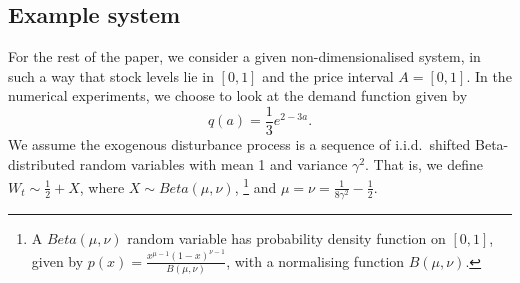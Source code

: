 \documentclass[main.tex]{subfiles}
\begin{document}
\subsection{Example system}\label{sec:bellman_example_markdown}
For the rest of the paper, we consider a given non-dimensionalised
system, in such a way that stock levels lie in $[0,1]$ and the price
interval $A=[0,1]$.
In the numerical experiments, we choose to look at the demand function
given by
\begin{equation}
  q(a)=\frac{1}{3}e^{2-3a}.
\end{equation}
We assume the exogenous disturbance process is a sequence of
i.i.d.~shifted Beta-distributed random variables with mean 1 and variance
$\gamma^2$. That is, we define $W_t\sim \frac{1}{2}+X$, where
$X\sim Beta(\mu,\nu)$,
\footnote{A $Beta(\mu,\nu)$ random variable has probability density
  function on $[0,1]$, given by
  $p(x)=\frac{x^{\mu-1}{(1-x)}^{\nu-1}}{B(\mu,\nu)}$, with a
  normalising function $B(\mu,\nu)$.
}
and $\mu=\nu=\frac{1}{8\gamma^2}-\frac{1}{2}$.
\end{document}

